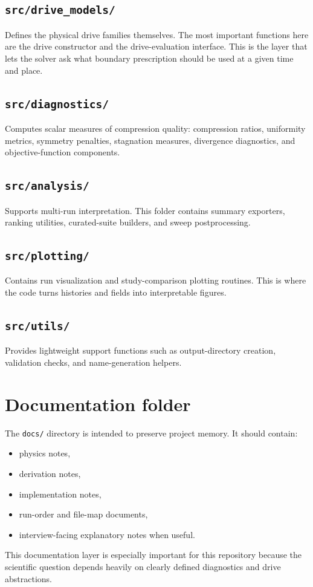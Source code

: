 \documentclass[11pt]{article}
\begin{document}
\subsection{\texttt{src/drive\_models/}}
Defines the physical drive families themselves. The most important functions here are the drive constructor and the drive-evaluation interface. This is the layer that lets the solver ask what boundary prescription should be used at a given time and place.

\subsection{\texttt{src/diagnostics/}}
Computes scalar measures of compression quality: compression ratios, uniformity metrics, symmetry penalties, stagnation measures, divergence diagnostics, and objective-function components.

\subsection{\texttt{src/analysis/}}
Supports multi-run interpretation. This folder contains summary exporters, ranking utilities, curated-suite builders, and sweep postprocessing.

\subsection{\texttt{src/plotting/}}
Contains run visualization and study-comparison plotting routines. This is where the code turns histories and fields into interpretable figures.

\subsection{\texttt{src/utils/}}
Provides lightweight support functions such as output-directory creation, validation checks, and name-generation helpers.

\section{Documentation folder}
The \texttt{docs/} directory is intended to preserve project memory. It should contain:
\begin{itemize}[leftmargin=1.8em]
    \item physics notes,
    \item derivation notes,
    \item implementation notes,
    \item run-order and file-map documents,
    \item interview-facing explanatory notes when useful.
\end{itemize}
This documentation layer is especially important for this repository because the scientific question depends heavily on clearly defined diagnostics and drive abstractions.
\end{document}
